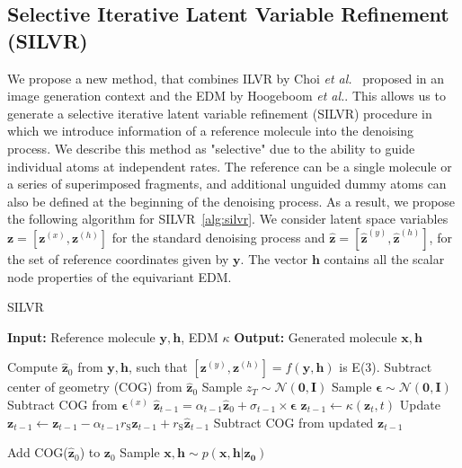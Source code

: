 \documentclass[journal=jacsat,manuscript=article]{achemso}
\begin{document}
\subsection{Selective Iterative Latent Variable Refinement (SILVR)}
\label{sec:silvr}
We propose a new method, that combines ILVR by Choi \textit{et al.}~\cite{choi2021ilvr} proposed in an image generation context and the EDM by Hoogeboom \textit{et al.}. This allows us to generate a selective iterative latent variable refinement (SILVR) procedure in which we introduce information of a reference molecule into the denoising process. We describe this method as "selective" due to the ability to guide individual atoms at independent rates. The reference can be a single molecule or a series of superimposed fragments, and additional unguided dummy atoms can also be defined at the beginning of the denoising process. As a result, we propose the following algorithm for SILVR~\ref{alg:silvr}.  We consider latent space variables $\mathbf{z}=[\mathbf{z}^{(x)},\mathbf{z}^{(h)}]$ for the standard denoising process and  $\mathbf{\hat{z}} = [\mathbf{\hat{z}}^{(y)},\mathbf{\hat{z}}^{(h)}]$, for the set of reference coordinates given by $\mathbf{y}$. The vector $\mathbf{h}$ contains all the scalar node properties of the equivariant EDM. 
\begin{algorithm}
\caption{SILVR}\label{alg:silvr}
\begin{algorithmic}[1]
\State \textbf{Input:} Reference molecule $\mathbf{y,h}$, EDM $\kappa$ 
\State \textbf{Output:} Generated molecule $\mathbf{x,h}$

\State Compute $\mathbf{\hat{z}}_0$ from $\mathbf{y, h}$, such that $[\mathbf{z}^{(y)} , \mathbf{z}^{(h)} ] = f (\mathbf{y, h})$ is E(3). 
\State Subtract center of geometry (COG) from $\mathbf{\hat{z}}_0$
\State Sample $z_T \sim \mathcal{N}(\mathbf{0,I})$
    \State Sample $\boldsymbol{\epsilon} \sim \mathcal{N}(\mathbf{0,I})$
    \State Subtract COG from $\boldsymbol{\epsilon}^{(x)}$
    \State $\mathbf{\hat{z}}_{t-1} = \alpha_{t-1} \mathbf{\hat{z}}_{0} +\sigma_{t-1}\times\boldsymbol{\epsilon}$
    \State $\mathbf{z}_{t-1} \gets \kappa (\mathbf{z}_t,t)$
    \State Update $\mathbf{z}_{t-1} \gets \mathbf{z}_{t-1} - \alpha_{t-1}r_{\mathrm{S}} \mathbf{z}_{t-1} +r_{\mathrm{S}} \mathbf{\hat{z}}_{t-1}$ 
    \State Subtract COG from updated $\mathbf{z}_{t-1}$

\EndFor
\State Add COG($\mathbf{\hat{z}}_0$) to $\mathbf{z}_0$
\State Sample $\mathbf{x,h} \sim p(\mathbf{x,h|z_0})$ 
\end{algorithmic}
\end{algorithm}
\end{document}
